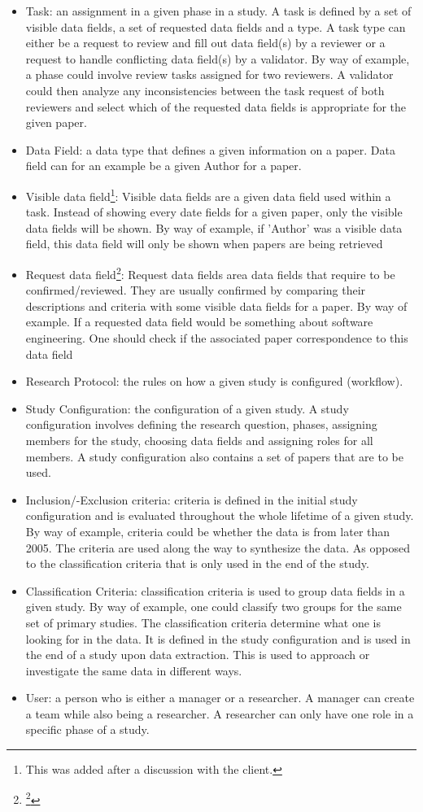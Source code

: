 \begin{itemize}
	\item Task: an assignment in a given phase in a study. A task is defined by a set of visible data fields, a set of requested data fields and a type. A task type can either be a request to review and fill out data field(s) by a reviewer or a request to handle conflicting data field(s) by a validator. By way of example, a phase could involve review tasks assigned for two reviewers. A validator could then analyze any inconsistencies between the task request of both reviewers and select which of the requested data fields is appropriate for the given paper.
	\item Data Field: a data type that defines a given information on a paper. Data field can for an example be a given Author for a paper.
	\item Visible data field\footnote{This was added after a discussion with the client.}: Visible data fields are a given data field used within a task. Instead of showing every date fields for a given paper, only the visible data fields will be shown. By way of example, if 'Author' was a visible data field, this data field will only be shown when papers are being retrieved
	\item Request data field\footnote{\footnote{This was added after a discussion with the client.}}: Request data fields area data fields that require to be confirmed/reviewed. They are usually confirmed by comparing their descriptions and criteria with some visible data fields for a paper. By way of example. If a requested data field would be something about software engineering. One should check if the associated paper correspondence to this data field
	\item Research Protocol: the rules on how a given study is configured (workflow).
	\item Study Configuration: the configuration of a given study. A study configuration involves defining the research question, phases, assigning members for the study, choosing data fields and assigning roles for all members. A study configuration also contains a set of papers that are to be used. 
	\item Inclusion/-Exclusion criteria: criteria is defined in the initial study configuration and is evaluated throughout the whole lifetime of a given study. By way of example, criteria could be whether the data is from later than 2005. The criteria are used along the way to synthesize the data. As opposed to the classification criteria that is only used in the end of the study. 
	\item Classification Criteria: classification criteria is used to group data fields in a given study. By way of example, one could classify two groups for the same set of primary studies. The classification criteria determine what one is looking for in the data. It is defined in the study configuration and is used in the end of a study upon data extraction. This is used to approach or investigate the same data in different ways.
	\item User: a person who is either a manager or a researcher. A manager can create a team while also being a researcher. A researcher can only have one role in a specific phase of a study. 
\end{itemize}

